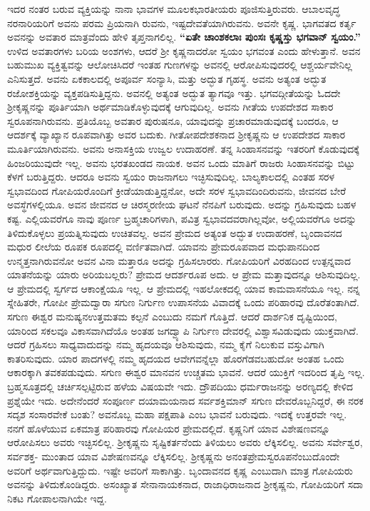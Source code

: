 ಇದರ ನಂತರ ಬರುವ ವ್ಯಕ್ತಿಯನ್ನು ನಾನಾ ಭಾವಗಳ ಮೂಲಕ\break ಭಾರತೀಯರು ಪೂಜಿಸುತ್ತಿರುವರು. ಆಬಾಲವೃದ್ಧ ನರನಾರಿಯರಿಗೆ ಅವನು ಪರಮ ಪ್ರಿಯನಾಗಿ ರುವನು, ಇಷ್ಟದೇವತೆಯಾಗಿರುವನು. ಅವನೇ ಕೃಷ್ಣ. ಭಾಗವತದ ಕರ್ತೃ ಅವನನ್ನು ಅವತಾರ ಮಾತ್ರವೆಂದು ಹೇಳಿ ತೃಪ್ತನಾಗಲಿಲ್ಲ. \textbf{“ಏತೇ ಚಾಂಶಕಲಾಃ ಪುಂಸಃ ಕೃಷ್ಣಸ್ತು ಭಗವಾನ್​ ಸ್ವಯಂ.”} ಉಳಿದ ಅವತಾರಗಳು ಬರಿಯ ಅಂಶಗಳು, ಆದರೆ ಶ‍್ರೀ ಕೃಷ್ಣನಾದರೋ ಸ್ವಯಂ ಭಗವಂತ ಎಂದು ಹೇಳುತ್ತಾನೆ. ಅವನ ಬಹುಮುಖ ವ್ಯಕ್ತಿತ್ವವನ್ನು ಆಲೋಚಿಸಿದರೆ ಇಂತಹ ಗುಣಗಳನ್ನು ಅವನಲ್ಲಿ ಆರೋಪಿಸುವುದರಲ್ಲಿ ಆಶ್ಚರ್ಯ\-ವೇನಿಲ್ಲ ಎನಿಸುತ್ತದೆ. ಅವನು ಏಕಕಾಲದಲ್ಲಿ ಅಪೂರ್ವ ಸಂನ್ಯಾಸಿ, ಮತ್ತು ಅದ್ಭುತ ಗೃಹಸ್ಥ. ಅವನು ಅತ್ಯಂತ ಅದ್ಭುತ ರಜೋಶಕ್ತಿಯನ್ನು ವ್ಯಕ್ತಪಡಿಸುತ್ತಿದ್ದನು. ಅವನಲ್ಲಿ ಅತ್ಯಂತ ಅದ್ಭುತ ತ್ಯಾಗವೂ ಇತ್ತು. ಭಗವದ್ಗೀತೆಯನ್ನು ಓದದೇ ಶ‍್ರೀಕೃಷ್ಣನನ್ನು ಪೂರ್ತಿಯಾಗಿ ಅರ್ಥಮಾಡಿಕೊಳ್ಳುವುದಕ್ಕೆ ಆಗುವುದಿಲ್ಲ. ಅವನು ಗೀತೆಯ ಉಪದೇಶದ ಸಾಕಾರ ಸ್ವರೂಪನಾಗಿರುವನು. ಪ್ರತಿಯೊಬ್ಬ ಅವತಾರ ಪುರುಷನೂ, ಯಾವು\-ದನ್ನು ಪ್ರಚಾರಮಾಡುವುದಕ್ಕೆ ಬಂದರೂ, ಆ ಆದರ್ಶಕ್ಕೆ ವ್ಯಾಖ್ಯಾನ ರೂಪವಾಗಿತ್ತು ಅವರ ಬದುಕು. ಗೀತೋಪದೇಶಕನಾದ ಶ‍್ರೀಕೃಷ್ಣನು ಆ ಉಪದೇಶದ ಸಾಕಾರ ಮೂರ್ತಿಯಾಗಿರುವನು. ಅವನು ಅನಾಸಕ್ತಿಯ ಉಜ್ವಲ ಉದಾ\-ಹರಣೆ. ತನ್ನ ಸಿಂಹಾಸನವನ್ನು ಇತರರಿಗೆ ಕೊಡುವುದಕ್ಕೆ ಹಿಂಜರಿಯುವುದೇ ಇಲ್ಲ. ಅವನು ಭರತಖಂಡದ ನಾಯಕ. ಅವನ ಒಂದು ಮಾತಿಗೆ ರಾಜರು ಸಿಂಹಾಸನವನ್ನು ಬಿಟ್ಟು ಕೆಳಗೆ ಬರುತ್ತಿದ್ದರು. ಆದರೂ ಅವನು ಸ್ವಯಂ ರಾಜ\-ನಾಗಲು ಇಚ್ಛಿಸುವುದಿಲ್ಲ. ಬಾಲ್ಯಕಾಲದಲ್ಲಿ ಎಂತಹ ಸರಳ ಸ್ವಭಾವದಿಂದ ಗೋಪಿಯರೊಂದಿಗೆ ಕ್ರೀಡೆಯಾಡುತ್ತಿದ್ದನೋ, ಅದೇ ಸರಳ ಸ್ವಭಾವದಿಂದಿರುವನು, ಜೀವನದ ಬೇರೆ ಅವಸ್ಥೆಗಳಲ್ಲಿಯೂ. ಅವನ ಜೀವನದ ಆ ಚಿರಸ್ಮರಣೀಯ ಘಟನೆ ನೆನಪಿಗೆ ಬರುವುದು. ಅದನ್ನು ಗ್ರಹಿಸುವುದು ಬಹಳ ಕಷ್ಟ. ಎಲ್ಲಿಯವರೆಗೂ ನಾವು ಪೂರ್ಣ ಬ್ರಹ್ಮಚಾರಿಗಳಾಗಿ, ಪವಿತ್ರ ಸ್ವಭಾವದವರಾಗಿಲ್ಲವೋ, ಅಲ್ಲಿಯವರೆಗೂ ಅದನ್ನು ತಿಳಿದುಕೊಳ್ಳಲು ಪ್ರಯತ್ನಿಸುವುದು ಉಚಿತವಲ್ಲ. ಅವನ ಪ್ರೇಮದ ಅತ್ಯಂತ ಅದ್ಭುತ ಉದಾಹರಣೆ, ಬೃಂದಾವನದ ಮಧುರ ಲೀಲೆಯ ರೂಪಕ ರೂಪದಲ್ಲಿ ವರ್ಣಿತವಾಗಿದೆ. ಯಾವನು ಪ್ರೇಮರೂಪವಾದ ಮಧುಪಾನದಿಂದ ಉನ್ಮತ್ತನಾಗಿರುವನೋ ಅವನ ವಿನಾ ಮತ್ತಾರೂ ಅದನ್ನು ಗ್ರಹಿಸಲಾರರು. ಗೋಪಿಯರಿಗೆ ವಿರಹದಿಂದ ಉತ್ಪನ್ನವಾದ ಯಾತನೆಯನ್ನು ಯಾರು ಅರಿಯಬಲ್ಲರು? ಪ್ರೇಮದ ಆದರ್ಶರೂಪ ಅದು. ಆ ಪ್ರೇಮ ಮತ್ತಾವುದನ್ನೂ ಆಶಿಸುವುದಿಲ್ಲ. ಆ ಪ್ರೇಮದಲ್ಲಿ ಸ್ವರ್ಗದ ಆಕಾಂಕ್ಷೆಯೂ ಇಲ್ಲ. ಆ ಪ್ರೇಮದಲ್ಲಿ ಇಹಲೋಕದಲ್ಲಿ ಯಾವ ಕಾಮವಾಸನೆಯೂ ಇಲ್ಲ. ನನ್ನ ಸ್ನೇಹಿತರೇ, ಗೋಪೀ ಪ್ರೇಮದ್ವಾರಾ ಸಗುಣ ನಿರ್ಗುಣ ಉಪಾಸನೆಯ ವಿವಾದಕ್ಕೆ ಒಂದು ಪರಿಹಾರವು ದೊರೆತಂತಾಗಿದೆ. ಸಗುಣ ಈಶ್ವರ ಮನುಷ್ಯನ\break ಉತ್ತಮತಮ ಕಲ್ಪನೆ ಎಂಬುದು ನಮಗೆ ಗೊತ್ತಿದೆ. ಆದರೆ ದಾರ್ಶನಿಕ ದೃಷ್ಟಿಯಿಂದ, ಯಾರಿಂದ ಸಕಲವೂ ವಿಕಾಸವಾಗಿದೆಯೊ ಅಂತಹ ಜಗದ್ವ್ಯಾಪಿ ನಿರ್ಗುಣ ದೇವರಲ್ಲಿ ವಿಶ್ವಾಸವಿಡುವುದು ಯುಕ್ತವಾಗಿದೆ. ಆದರೆ ಗ್ರಹಿಸಲು ಸಾಧ್ಯವಾದುದನ್ನು ನಮ್ಮ ಹೃದಯವೂ ಆಶಿಸುವುದು, ನಮ್ಮ ಕೈಗೆ ನಿಲುಕುವ ವಸ್ತುವಿಗಾಗಿ ಕಾತರಿಸುವುದು. ಯಾರ ಪಾದಗಳಲ್ಲಿ ನಮ್ಮ ಹೃದಯದ ಆವೇಗವನ್ನೆಲ್ಲಾ ಹೊರಗೆಡವಬಹುದೋ ಅಂತಹ ಒಂದು ಆಕಾರಕ್ಕಾಗಿ ತವಕಪಡುವುದು. ಸಗುಣ ಈಶ್ವರ ಮಾನವನ ಉಚ್ಚತಮ ಭಾವನೆ. ಆದರೆ ಯುಕ್ತಿಗೆ ಇದರಿಂದ ತೃಪ್ತಿ ಇಲ್ಲ. ಬ್ರಹ್ಮಸೂತ್ರದಲ್ಲಿ ಚರ್ಚಿಸಲ್ಪಟ್ಟಿರುವ ಹಳೆಯ ವಿಷಯವೇ ಇದು. ದ್ರೌಪದಿಯು ಧರ್ಮರಾಜನನ್ನು ಅರಣ್ಯದಲ್ಲಿ ಕೇಳಿದ ಪ್ರಶ್ನೆಯೇ ಇದು. ಅದೇನೆಂದರೆ ಸಂಪೂರ್ಣ ದಯಾಮಯನಾದ ಸರ್ವಶಕ್ತಿಮಾನ್​ ಸಗುಣ ದೇವರೊಬ್ಬನಿದ್ದರೆ, ಈ ನರಕ ಸದೃಶ ಸಂಸಾರವೇಕೆ ಬಂತು? ಅವನೊಬ್ಬ ಮಹಾ ಪಕ್ಷಪಾತಿ ಎಂಬ ಭಾವನೆ ಬರುವುದು. ಇದಕ್ಕೆ ಉತ್ತರವೇ ಇಲ್ಲ. ನನಗೆ ಹೊಳೆಯುವ ಏಕಮಾತ್ರ ಪರಿಹಾರವು ಗೋಪಿಯರ ಪ್ರೇಮದಲ್ಲಿದೆ. ಕೃಷ್ಣನಿಗೆ ಯಾವ ವಿಶೇಷಣವನ್ನೂ ಆರೋಪಿಸಲು ಅವರು ಇಚ್ಛಿಸಲಿಲ್ಲ. ಶ‍್ರೀಕೃಷ್ಣನು ಸೃಷ್ಟಿಕರ್ತನೆಂದು ತಿಳಿಯಲು ಅವರು ಲೆಕ್ಕಿಸಲಿಲ್ಲ. ಅವನು ಸರ್ವೇಶ್ವರ, ಸರ್ವಶಕ್ತ- ಮುಂತಾದ ಯಾವ ವಿಶೇಷಣವನ್ನೂ ಲೆಕ್ಕಿಸಲಿಲ್ಲ. ಶ‍್ರೀಕೃಷ್ಣನು ಅನಂತಪ್ರೇಮಸ್ವರೂಪನೆಂಬುದೊಂದೇ ಅವರಿಗೆ ಅರ್ಥವಾಗುತ್ತಿದ್ದುದು. ಇಷ್ಟೇ ಅವರಿಗೆ ಸಾಕಾಗಿತ್ತು. ಬೃಂದಾವನದ ಕೃಷ್ಣ ಎಂಬುದಾಗಿ ಮಾತ್ರ ಗೋಪಿಯರು ಅವನನ್ನು ತಿಳಿದುಕೊಂಡಿದ್ದರು. ಅಸಂಖ್ಯಾತ ಸೇನಾನಾಯಕನಾದ, ರಾಜಾಧಿರಾಜನಾದ ಶ‍್ರೀಕೃಷ್ಣನು, ಗೋಪಿಯರಿಗೆ ಸದಾ ನಿಕಟ ಗೋಪಾಲನಾಗಿಯೇ ಇದ್ದ.

